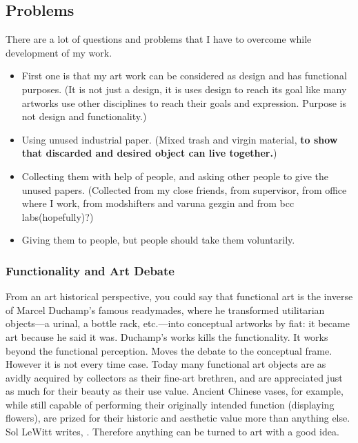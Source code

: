 \subsection{Problems}
There are a lot of questions and problems that I have to overcome while development of my work. 


\begin{itemize}
\item First one is that my art work can be considered as design and has functional purposes. (It is not just a design, it is uses design to reach its goal like many artworks use other disciplines to reach their goals and expression. Purpose is not design and functionality.)
\item Using unused industrial paper. (Mixed trash and virgin material, \textbf{to show that discarded and desired object can live together.})
\item Collecting them with help of people, and asking other people to give the unused papers. (Collected from my close friends, from supervisor, from office where I work, from modshifters and varuna gezgin and from bcc labs(hopefully)?)
\item Giving them to people, but people should take them voluntarily.
\end{itemize}

%
\subsubsection{Functionality and Art Debate}
From an art historical perspective, you could say that functional art is the inverse of Marcel Duchamp's famous readymades, where he transformed utilitarian objects---a urinal, a bottle rack, etc.---into conceptual artworks by fiat: it became art because he said it was. Duchamp's works kills the functionality. It works beyond the functional perception. Moves the debate to the conceptual frame. However it is not every time case. Today many functional art objects are as avidly acquired by collectors as their fine-art brethren, and are appreciated just as much for their beauty as their use value. Ancient Chinese vases, for example, while still capable of performing their originally intended function (displaying flowers), are prized for their historic and aesthetic value more than anything else.  Sol LeWitt writes,  \cite{lewitt1967paragraphs}. Therefore anything can be turned to art with a good idea. 

